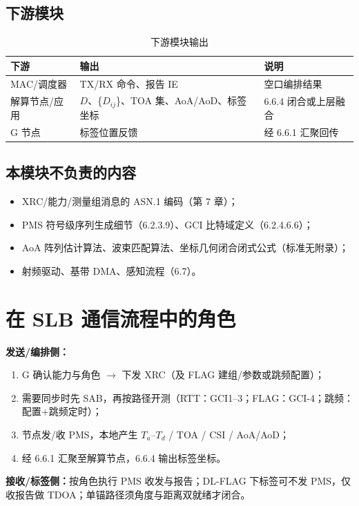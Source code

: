 \documentclass[11pt,a4paper]{ctexart}
\begin{document}
\subsection{下游模块}

\begin{longtable}{L{4cm}L{4.5cm}L{5.5cm}}
\caption{下游模块输出\label{tab:66-down}} \\
\toprule
\textbf{下游} & \textbf{输出} & \textbf{说明} \\
\midrule
MAC/调度器 & TX/RX 命令、报告 IE & 空口编排结果 \\
解算节点/应用 & $D$、\{$D_{ij}$\}、TOA 集、AoA/AoD、标签坐标 & 6.6.4 闭合或上层融合 \\
G 节点 & 标签位置反馈 & 经 6.6.1 汇聚回传 \\
\bottomrule
\end{longtable}

\subsection{本模块不负责的内容}

\begin{itemize}[nosep]
  \item XRC/能力/测量组消息的 ASN.1 编码（第 7 章）；
  \item PMS 符号级序列生成细节（6.2.3.9）、GCI 比特域定义（6.2.4.6.6）；
  \item AoA 阵列估计算法、波束匹配算法、坐标几何闭合闭式公式（标准无附录）；
  \item 射频驱动、基带 DMA、感知流程（6.7）。
\end{itemize}

\section{在 SLB 通信流程中的角色}

\textbf{发送/编排侧：}
\begin{enumerate}[nosep]
  \item G 确认能力与角色 $\rightarrow$ 下发 XRC（及 FLAG 建组/参数或跳频配置）；
  \item 需要同步时先 SAB，再按路径开测（RTT：GCI1--3；FLAG：GCI-4；跳频：配置+跳频定时）；
  \item 节点发/收 PMS，本地产生 $T_a$--$T_d$ / TOA / CSI / AoA/AoD；
  \item 经 6.6.1 汇聚至解算节点，6.6.4 输出标签坐标。
\end{enumerate}

\textbf{接收/标签侧：}按角色执行 PMS 收发与报告；DL-FLAG 下标签可不发 PMS，仅收报告做 TDOA；单锚路径须角度与距离双就绪才闭合。
\end{document}
